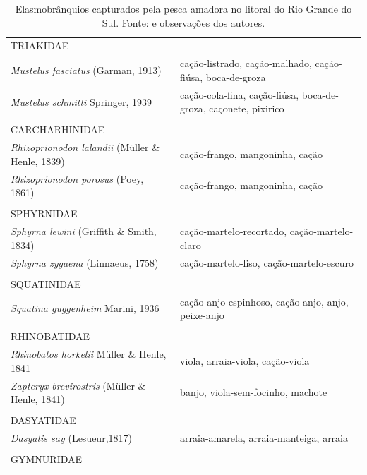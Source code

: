 \documentclass[a4paper,11pt,twoside,showtrims,onecolumn,openright,final]{memoir}
\begin{document}
\begin{table}
\caption[Elasmobrânquios capturados pela pesca amadora no litoral do Rio Grande do Sul.]
        {Elasmobrânquios capturados pela pesca amadora no litoral do Rio Grande do Sul. 
         Fonte: \citet{lewis1999} e observações dos autores.}
\label{tab:amador-elasmos}	 
\begin{center}
\begin{small}
\begin{tabular*}{\textwidth}{l@{\extracolsep{\fill}}p{}}
\toprule
TRIAKIDAE					& \\
\emph{Mustelus fasciatus} (Garman, 1913)		& cação-listrado, cação-malhado, cação-fiúsa, boca-de-groza \\
\emph{Mustelus schmitti} Springer, 1939		& cação-cola-fina, cação-fiúsa, boca-de-groza, caçonete, pixirico \\
						& \\
CARCHARHINIDAE					& \\
\emph{Rhizoprionodon lalandii} (Müller \& Henle, 1839)	& cação-frango, mangoninha, cação \\
\emph{Rhizoprionodon porosus} (Poey, 1861)		& cação-frango, mangoninha, cação \\
						& \\
SPHYRNIDAE					& \\
\emph{Sphyrna lewini} (Griffith \& Smith, 1834)		& cação-martelo-recortado, cação-martelo-claro \\
\emph{Sphyrna zygaena} (Linnaeus, 1758)		& cação-martelo-liso, cação-martelo-escuro \\
						& \\
SQUATINIDAE					& \\
\emph{Squatina guggenheim} Marini, 1936		& cação-anjo-espinhoso, cação-anjo, anjo, peixe-anjo \\
						& \\
RHINOBATIDAE					& \\
\emph{Rhinobatos horkelii} Müller \& Henle, 1841	& viola, arraia-viola, cação-viola \\
\emph{Zapteryx brevirostris} (Müller \& Henle, 1841)	& banjo, viola-sem-focinho, machote \\
						& \\
DASYATIDAE					& \\
\emph{Dasyatis say} (Lesueur,1817)			& arraia-amarela, arraia-manteiga, arraia \\
						& \\
GYMNURIDAE					& \\

\end{tabular*}
\end{small}
\end{center}
\end{table}
\end{document}
